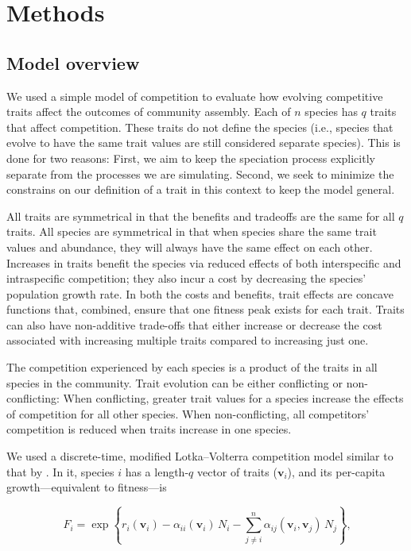 
\section*{Methods}


\subsection*{Model overview}

We used a simple model of competition to evaluate how evolving competitive traits
affect the outcomes of community assembly.
Each of $n$ species has $q$ traits that affect competition.
These traits do not define the species (i.e., species that evolve to have
the same trait values are still considered separate species).
This is done for two reasons:
First, we aim to keep the speciation process explicitly
separate from the processes we are simulating.
Second, we seek to minimize the constrains on our definition of a trait
in this context to keep the model general.


All traits are symmetrical in that the benefits and tradeoffs are 
the same for all $q$ traits.
All species are symmetrical in that when species share the same trait values and abundance, 
they will always have the same effect on each other.
Increases in traits benefit the species via reduced
effects of both interspecific and intraspecific competition;
they also incur a cost by decreasing the species' population growth rate.
In both the costs and benefits, trait effects are concave functions that,
combined, ensure that one fitness peak exists for each trait.
Traits can also have non-additive trade-offs that either increase or decrease
the cost associated with increasing multiple traits compared to increasing
just one.


The competition experienced by each species is a product of the traits in all
species in the community.
Trait evolution can be either conflicting or non-conflicting:
When conflicting, greater trait values for a species increase the effects of
competition for all other species.
When non-conflicting, all competitors' competition is reduced when traits
increase in one species.


We used a discrete-time, modified Lotka--Volterra competition model similar to
that by \citet{Northfield:2013if}.
In it, species $i$ has a length-$q$ vector of traits ($\mathbf{v}_i$), and
its per-capita growth---equivalent to fitness---is

\begin{equation} \label{eq:fitness}
    F_{i} = \exp \left\{ r_i(\mathbf{v}_i) - 
        \alpha_{ii}(\mathbf{v}_i) \, N_i - \sum_{j \ne i}^{n}{
            \alpha_{ij}(\mathbf{v}_i, \mathbf{v}_j) \, N_j}  
    \right\}\textrm{,}
\end{equation}

